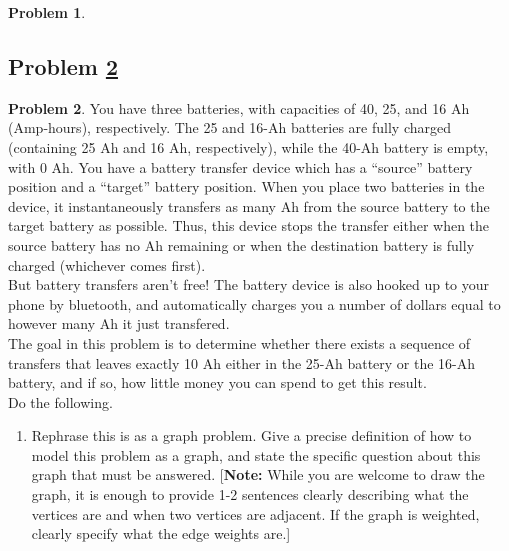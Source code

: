 \documentclass[11pt]{article}
\theoremstyle{definition}
\theoremstyle{definition}
\newtheorem{required}{Problem}
\theoremstyle{definition}
\begin{document}
\begin{}
\begin{}
\begin{}
\begin{required}
\end{required}

\begin{}




\newpage
\subsection{Problem \ref{Dijkstra2}} 
\begin{required} \label{Dijkstra2}
You have three batteries, with capacities of 40, 25, and 16 Ah (Amp-hours), respectively. The 25 and 16-Ah batteries are fully charged (containing 25 Ah and 16 Ah, respectively), while the 40-Ah battery is empty, with 0 Ah. You have a battery transfer device which has a ``source'' battery position and a ``target'' battery position. When you place two batteries in the device, it instantaneously transfers as many Ah from the source battery to the target battery as possible. Thus, this device stops the transfer either when the source battery has no Ah remaining or when the destination battery is fully charged (whichever comes first).  \\

\noindent But battery transfers aren't free! The battery device is also hooked up to your phone by bluetooth, and automatically charges you a number of dollars equal to however many Ah it just transfered.  \\
	
\noindent The goal in this problem is to determine whether there exists a sequence of transfers that leaves exactly 10 Ah either in the 25-Ah battery or the 16-Ah battery, and if so, how little money you can spend to get this result. \\

\noindent Do the following.
\begin{enumerate}[label=(\alph*)]
\subsubsection{Problem 6\ref{Dijkstra2a}}
\item \label{Dijkstra2a} Rephrase this is as a graph problem. Give a precise definition of how to model this problem as a graph, and state the specific question about this graph that must be answered. [\textbf{Note:} While you are welcome to draw the graph, it is enough to provide 1-2 sentences clearly describing what the vertices are and when two vertices are adjacent. If the graph is weighted, clearly specify what the edge weights are.]


\end{enumerate}
\end{required}
\end{}
\end{}
\end{}
\end{}
\end{document}
